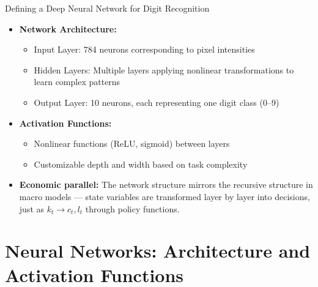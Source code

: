 \documentclass[10pt,english,aspectratio=169]{beamer}
\begin{document}
\begin{frame}{Defining a Deep Neural Network for Digit Recognition}
\begin{itemize}
\item \textbf{Network Architecture:}
\begin{itemize}
\item Input Layer: 784 neurons corresponding to pixel intensities
\item Hidden Layers: Multiple layers applying nonlinear transformations to learn complex patterns
\item Output Layer: 10 neurons, each representing one digit class (0--9)
\end{itemize}

\medskip
\item \textbf{Activation Functions:}
\begin{itemize}
\item Nonlinear functions (ReLU, sigmoid) between layers
\item Customizable depth and width based on task complexity
\end{itemize}

\medskip
\item \textbf{Economic parallel:} The network structure mirrors the recursive structure in macro models --- state variables are transformed layer by layer into decisions, just as $k_t \to c_t, l_t$ through policy functions.
\end{itemize}
\end{frame}

\section{Neural Networks: Architecture and Activation Functions}
\end{document}
